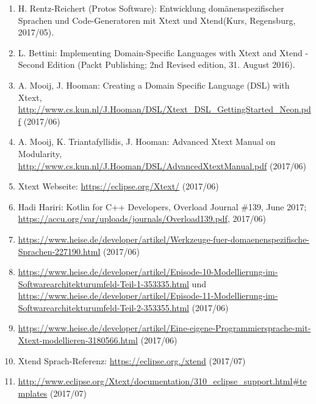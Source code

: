 \documentclass[a4]{article}
\begin{document}
\begin{enumerate}
\def\labelenumi{\arabic{enumi}.}
\item
  \protect\hypertarget{anchor-1}{}{}H. Rentz-Reichert (Protos Software):
  \dq Entwicklung domänenspezifischer Sprachen und Code-Generatoren mit
  Xtext und Xtend\dq (Kurs, Regensburg, 2017/05).
\item
  \protect\hypertarget{anchor-2}{}{}L. Bettini: \dq Implementing
  Domain-Specific Languages with Xtext and Xtend - Second Edition\dq
  (Packt Publishing; 2nd Revised edition, 31. August 2016).
\item
  \protect\hypertarget{anchor-3}{}{}A. Mooij, J. Hooman: \dq Creating a
  Domain Specific Language (DSL) with Xtext\dq,
  \url{http://www.cs.kun.nl/J.Hooman/DSL/Xtext_DSL_GettingStarted_Neon.pdf}
  (2017/06)
\item
  \protect\hypertarget{anchor-4}{}{}A. Mooij, K. Triantafyllidis, J.
  Hooman: \dq Advanced Xtext Manual on Modularity\dq,
  \url{http://www.cs.kun.nl/J.Hooman/DSL/AdvancedXtextManual.pdf}
  (2017/06)
\item
  \protect\hypertarget{anchor-5}{}{}Xtext Webseite:
  \url{https://eclipse.org/Xtext/} (2017/06)
\item
  \protect\hypertarget{anchor-11}{}{}Hadi Hariri: \dq Kotlin for C++
  Developers\dq, Overload Journal \#139, June 2017;
  \url{https://accu.org/var/uploads/journals/Overload139.pdf}, 2017/06)
\item
  \protect\hypertarget{anchor-7}{}{}\url{https://www.heise.de/developer/artikel/Werkzeuge-fuer-domaenenspezifische-Sprachen-227190.html}
  (2017/06)
\item
  \protect\hypertarget{anchor-8}{}{}\url{https://www.heise.de/developer/artikel/Episode-10-Modellierung-im-Softwarearchitekturumfeld-Teil-1-353335.html}
  und
  \url{https://www.heise.de/developer/artikel/Episode-11-Modellierung-im-Softwarearchitekturumfeld-Teil-2-353355.html}
  (2017/06)
\item
  \protect\hypertarget{anchor-6}{}{}\url{https://www.heise.de/developer/artikel/Eine-eigene-Programmiersprache-mit-Xtext-modellieren-3180566.html}
  (2017/06)
\item
  \protect\hypertarget{anchor-12}{}{}Xtend Sprach-Referenz:
  \url{https://eclipse.org./xtend} (2017/07)
\item
  \protect\hypertarget{anchor-13}{}{}\url{http://www.eclipse.org/Xtext/documentation/310_eclipse_support.html\#templates}
  (2017/07)
\end{enumerate}
\end{document}
